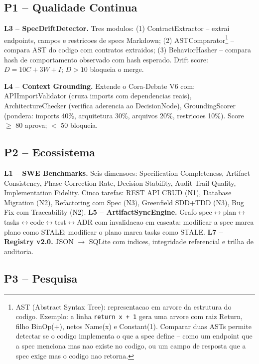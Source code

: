 \documentclass[12pt,a4paper,oneside,sumario=tradicional,chapter=TITLE,section=TITLE,subsection=TITLE,english,brazil]{abntex2}
\begin{document}
\subsection{P1 -- Qualidade Continua}

\textbf{L3 -- SpecDriftDetector.} Tres modulos: (1) ContractExtractor -- extrai endpoints, campos e restricoes de specs Markdown; (2) ASTComparator\footnote{AST (Abstract Syntax Tree): representacao em arvore da estrutura do codigo. Exemplo: a linha \texttt{return x + 1} gera uma arvore com raiz Return, filho BinOp(+), netos Name(x) e Constant(1). Comparar duas ASTs permite detectar se o codigo implementa o que a spec define -- como um endpoint que a spec menciona mas nao existe no codigo, ou um campo de resposta que a spec exige mas o codigo nao retorna.} -- compara AST do codigo com contratos extraidos; (3) BehaviorHasher -- compara hash de comportamento observado com hash esperado. Drift score: $D = 10C + 3W + I$; $D > 10$ bloqueia o merge.

\textbf{L4 -- Context Grounding.} Extende o Cora-Debate V6 com: APIImportValidator (cruza imports com dependencias reais), ArchitectureChecker (verifica aderencia ao DecisionNode), GroundingScorer (pondera: imports 40\%, arquitetura 30\%, arquivos 20\%, restricoes 10\%). Score $\geq$ 80 aprova; $<$ 50 bloqueia.

\subsection{P2 -- Ecossistema}

\textbf{L1 -- SWE Benchmarks.} Seis dimensoes: Specification Completeness, Artifact Consistency, Phase Correction Rate, Decision Stability, Audit Trail Quality, Implementation Fidelity. Cinco tarefas: REST API CRUD (N1), Database Migration (N2), Refactoring com Spec (N3), Greenfield SDD+TDD (N3), Bug Fix com Traceability (N2). \textbf{L5 -- ArtifactSyncEngine.} Grafo spec$\leftrightarrow$plan$\leftrightarrow$tasks$\leftrightarrow$code$\leftrightarrow$test$\leftrightarrow$ADR com invalidacao em cascata: modificar a spec marca plano como STALE; modificar o plano marca tasks como STALE. \textbf{L7 -- Registry v2.0.} JSON $\to$ SQLite com indices, integridade referencial e trilha de auditoria.

\subsection{P3 -- Pesquisa}
\end{document}

